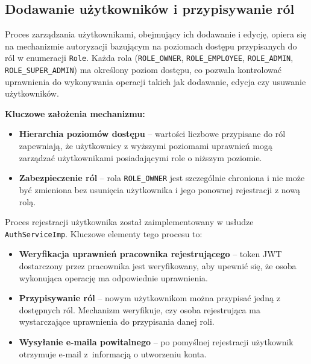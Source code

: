 \subsection{Dodawanie użytkowników i przypisywanie ról}

Proces zarządzania użytkownikami, obejmujący ich dodawanie i edycję, opiera się na mechanizmie autoryzacji bazującym na poziomach dostępu przypisanych do ról w enumeracji \texttt{Role}. Każda rola (\texttt{ROLE\_OWNER}, \texttt{ROLE\_EMPLOYEE}, \texttt{ROLE\_ADMIN}, \texttt{ROLE\_SUPER\_ADMIN}) ma określony poziom dostępu, co pozwala kontrolować uprawnienia do wykonywania operacji takich jak dodawanie, edycja czy usuwanie użytkowników.

\textbf{Kluczowe założenia mechanizmu:}
\begin{itemize}
    \item \textbf{Hierarchia poziomów dostępu} -- wartości liczbowe przypisane do ról zapewniają, że użytkownicy z wyższymi poziomami uprawnień mogą zarządzać użytkownikami posiadającymi role o niższym poziomie.
    \item \textbf{Zabezpieczenie ról} -- rola \texttt{ROLE\_OWNER} jest szczególnie chroniona i nie może być zmieniona bez usunięcia użytkownika i jego ponownej rejestracji z nową rolą.
\end{itemize}

Proces rejestracji użytkownika został zaimplementowany w usłudze \texttt{AuthServiceImp}. Kluczowe elementy tego procesu to:
\begin{itemize}
    \item \textbf{Weryfikacja uprawnień pracownika rejestrującego} -- token JWT dostarczony przez pracownika jest weryfikowany, aby upewnić się, że osoba wykonująca operację ma odpowiednie uprawnienia.
    \item \textbf{Przypisywanie ról} -- nowym użytkownikom można przypisać jedną z dostępnych ról. Mechanizm weryfikuje, czy osoba rejestrująca ma wystarczające uprawnienia do przypisania danej roli.
    \item \textbf{Wysyłanie e-maila powitalnego} -- po pomyślnej rejestracji użytkownik otrzymuje e-mail z~informacją o utworzeniu konta.
\end{itemize}

